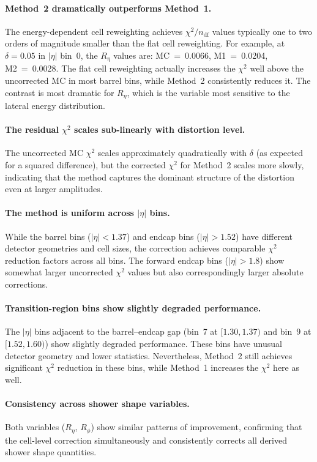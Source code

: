 \documentclass[12pt,a4paper]{article}
\begin{document}
\paragraph{Method~2 dramatically outperforms Method~1.}
The energy-dependent cell reweighting achieves $\chi^2/n_\text{df}$ values
typically one to two orders of magnitude smaller than the flat cell
reweighting. For example, at $\delta=0.05$ in $|\eta|$ bin~0, the $R_\eta$
values are: MC~=~0.0066, M1~=~0.0204, M2~=~0.0028. The flat cell
reweighting actually increases the $\chi^2$ well above the uncorrected MC in
most barrel bins, while Method~2 consistently reduces it. The contrast is
most dramatic for $R_\eta$, which is the variable most sensitive to the
lateral energy distribution.

\paragraph{The residual $\chi^2$ scales sub-linearly with distortion level.}
The uncorrected MC $\chi^2$ scales approximately quadratically with $\delta$
(as expected for a squared difference), but the corrected $\chi^2$ for
Method~2 scales more slowly, indicating that the method captures the dominant
structure of the distortion even at larger amplitudes.

\paragraph{The method is uniform across $|\eta|$ bins.}
While the barrel bins ($|\eta|<1.37$) and endcap bins ($|\eta|>1.52$) have
different detector geometries and cell sizes, the correction achieves
comparable $\chi^2$ reduction factors across all bins. The forward endcap bins
($|\eta|>1.8$) show somewhat larger uncorrected $\chi^2$ values but also
correspondingly larger absolute corrections.

\paragraph{Transition-region bins show slightly degraded performance.}
The $|\eta|$ bins adjacent to the barrel--endcap gap (bin~7 at
$[1.30,1.37)$ and bin~9 at $[1.52,1.60)$) show slightly degraded
performance. These bins have unusual detector geometry and lower statistics.
Nevertheless, Method~2 still achieves significant $\chi^2$ reduction in these
bins, while Method~1 increases the $\chi^2$ here as well.

\paragraph{Consistency across shower shape variables.}
Both variables ($R_\eta$, $R_\phi$) show similar patterns
of improvement, confirming that the cell-level correction simultaneously and
consistently corrects all derived shower shape quantities.
\end{document}
